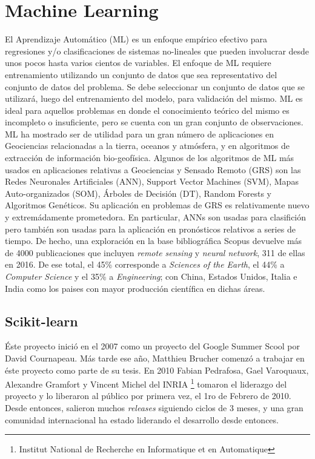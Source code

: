 


\section{Machine Learning}

El Aprendizaje Automático (ML) es un enfoque empírico efectivo para
regresiones y/o clasificaciones de sistemas no-lineales que pueden involucrar desde
unos pocos hasta varios cientos de variables. El enfoque de ML requiere
entrenamiento utilizando un conjunto de datos que sea representativo del conjunto
de datos del problema. Se debe seleccionar un conjunto de datos que se utilizará,
luego del entrenamiento del modelo, para validación del mismo.
ML es ideal para aquellos problemas en donde el conocimiento teórico del mismo
es incompleto o insuficiente, pero se cuenta con un gran conjunto de observaciones.
ML ha mostrado ser de utilidad para un gran número de aplicaciones en Geociencias
relacionadas a la tierra, oceanos y atmósfera, y en algoritmos de extracción
de información bio-geofísica.
Algunos de los algoritmos de ML más usados en aplicaciones relativas a
Geociencias y Sensado Remoto (GRS) son las Redes Neuronales Artificiales (ANN),
Support Vector Machines (SVM), Mapas Auto-organizados (SOM), Árboles de Decisión (DT),
Random Forests y Algoritmos Genéticos. Su aplicación en problemas de GRS es
relativamente nuevo y extremádamente prometedora. En particular, ANNs son
usadas para clasifición pero también son usadas para la aplicación en pronósticos
relativos a series de tiempo.
De hecho, una exploración en la base bibliográfica Scopus devuelve más de 4000
publicaciones que incluyen \textit{remote sensing} y \textit{neural network},
311 de ellas en 2016. De ese total, el 45\% corresponde a
\textit{Sciences of the Earth}, el 44\% a \textit{Computer Science} y el 35\% a
\textit{Engineering}; con China, Estados Unidos, Italia e India como los paises
con mayor producción científica en dichas áreas.


\subsection{Scikit-learn}
Éste proyecto inició en el 2007 como un proyecto del Google Summer Scool por David
Cournapeau. Más tarde ese año, Matthieu Brucher comenzó a trabajar en éste proyecto
como parte de su tesis. En 2010 Fabian Pedrafosa, Gael Varoquaux, Alexandre
Gramfort y Vincent Michel del INRIA \footnote{Institut National de Recherche
en Informatique et en Automatique} tomaron el liderazgo del proyecto y lo liberaron
al público por primera vez, el 1ro de Febrero de 2010. Desde entonces, salieron muchos
\textit{releases} siguiendo ciclos de 3 meses, y una gran comunidad internacional
ha estado liderando el desarrollo desde entonces.

